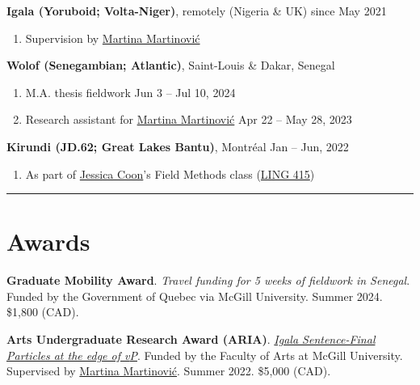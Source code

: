 \documentclass[margin,line]{resume}
\begin{document}
\begin{resume}
	\textbf{Igala (Yoruboid; Volta-Niger)}, remotely (Nigeria \& UK) \hfill since May 2021
	\begin{enumerate}[-, leftmargin=1em, topsep=4pt]
		\item[] Supervision by \href{https://inamartinovic.com/}{Martina Martinović}
	\end{enumerate}


	\textbf{Wolof (Senegambian; Atlantic)}, Saint-Louis \& Dakar, Senegal %
	\begin{enumerate}[-, leftmargin=1em, topsep=4pt]
		\item[] M.A. thesis fieldwork \hfill Jun 3 -- Jul 10, 2024
		\item[] Research assistant for \href{https://inamartinovic.com/}{Martina Martinović} \hfill Apr 22 -- May 28, 2023
	\end{enumerate}

	\textbf{Kirundi (JD.62; Great Lakes Bantu)}, Montréal \hfill Jan -- Jun, 2022
	\begin{enumerate}[-, leftmargin=1em, topsep=4pt]
		\item[] As part of \href{https://jessica.lingspace.org/}{Jessica Coon}'s Field Methods class (\href{https://www.mcgill.ca/study/2021-2022/courses/ling-415}{LING 415})
	\end{enumerate}

	\vspace{-0.9em}\rule{\textwidth}{0.4pt}


	\section{\mysidestyle Awards}

	
	{\textbf{Graduate Mobility Award}. \textit{Travel funding for 5 weeks of fieldwork in Senegal}. Funded by the Government of Quebec via McGill University. %
	Summer 2024. \$1,800 (CAD).}	
	
	{\textbf{Arts Undergraduate Research Award (ARIA)}. \href{https://www.mcgill.ca/arts-internships/files/arts-internships/brandon_chaperon.pdf}{\textit{Igala Sentence-Final Particles at the edge of \textit{v}P}}. Funded by the Faculty of Arts at McGill University. Supervised by \href{https://inamartinovic.com/}{Martina Martinović}. Summer 2022. \$5,000 (CAD).}


\end{resume}
\end{document}
